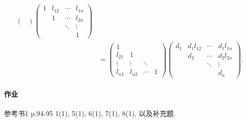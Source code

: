 \documentclass[hidelinks]{ctexart}
\begin{document}
\begin{align*}
\begin{pmatrix}
    \end{pmatrix}\begin{pmatrix}
        1 & l_{12} & \cdots & l_{1n} \\
        & 1 & \cdots & l_{2n} \\
        & & \ddots & \vdots \\
        & & & 1
    \end{pmatrix} \\
    &= \begin{pmatrix}
        1 & & & \\
        l_{21} & 1 & & \\
        \vdots & \vdots & \ddots \\
        l_{n1} & l_{n2} & \cdots & 1
    \end{pmatrix}\begin{pmatrix}
        d_1 & d_1 l_{12} & \cdots & d_1 l_{1n} \\
        & d_2 & \cdots & d_2 l_{2n} \\
        & & \ddots & \vdots \\
        & & & d_n
    \end{pmatrix}.
\end{align*}



\paragraph{作业} %
\label{par:作业}

参考书1 p.94-95 1(1), 5(1), 6(1), 7(1), 8(1), 以及补充题.


\end{document}
